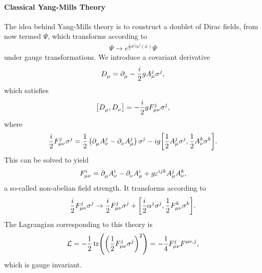 \paragraph{Classical Yang-Mills Theory}
The idea behind Yang-Mills theory is to construct a doublet of Dirac fields, from now termed $\Psi$, which transforms according to
\begin{align*}
	\Psi \to e^{\frac{i}{2}\sigma^{j}\alpha^{j}(x)}\Psi
\end{align*}
under gauge transformations. We introduce a covariant derivative
\begin{align*}
	D^{}_{\mu} = \partial^{}_{\mu}{} - \frac{i}{2}gA_{\mu}^{j}\sigma^{j},
\end{align*}
which satisfies
\begin{align*}
	\comm{\cdel{}{\mu}}{\cdel{}{\nu}} = - \frac{i}{2}gF_{\mu\nu}^{j}\sigma^{j},
\end{align*}
where
\begin{align*}
	\frac{i}{2}F_{\mu\nu}^{j}\sigma^{j} = \frac{1}{2}\left(\del{}{\mu}{A_{\nu}^{j}} - \del{}{\nu}{A_{\mu}^{j}}\right)\sigma^{j} - ig\comm{\frac{1}{2}A_{\mu}^{j}\sigma^{j}}{\frac{1}{2}A_{\nu}^{k}\sigma^{k}}.
\end{align*}
This can be solved to yield
\begin{align*}
	F_{\mu\nu}^{i} = \partial^{}_{\mu}{A_{\nu}^{i}} - \partial^{}_{\nu}{A_{\mu}^{i}} + g\varepsilon^{ijk}A_{\mu}^{j}A_{\nu}^{k},
\end{align*}
a so-called non-abelian field strength. It transforms according to
\begin{align*}
	\frac{i}{2}F_{\mu\nu}^{j}\sigma^{j} \to \frac{i}{2}F_{\mu\nu}^{j}\sigma^{j} + \comm{\frac{i}{2}\alpha^{j}\sigma^{j}}{\frac{1}{2}F_{\mu\nu}^{k}\sigma^{k}}.
\end{align*}
The Lagrangian corresponding to this theory is
\begin{align*}
	\mathcal{L} = -\frac{1}{2}\tr(\left(\frac{1}{2}F_{\mu\nu}^{j}\sigma^{j}\right)^{2}) = -\frac{1}{4}F_{\mu\nu}^{j}F^{\mu\nu, j},
\end{align*}
which is gauge invariant.